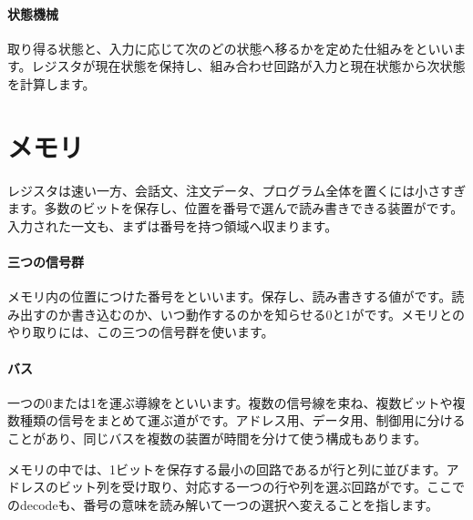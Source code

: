 \par
\endgroup
\medskip
\begingroup
      \centering
      \vspace{3mm}
\paragraph{状態機械}
        取り得る状態と、入力に応じて次のどの状態へ移るかを定めた仕組みをといいます。レジスタが現在状態を保持し、組み合わせ回路が入力と現在状態から次状態を計算します。

\par
\endgroup
\par
\endgroup


\section{メモリ}
\label{sec:01-digital-computer-12}

レジスタは速い一方、会話文、注文データ、プログラム全体を置くには小さすぎます。多数のビットを保存し、位置を番号で選んで読み書きできる装置がです。入力された一文も、まずは番号を持つ領域へ収まります。

\begingroup
\begingroup
\paragraph{三つの信号群}
        メモリ内の位置につけた番号をといいます。保存し、読み書きする値がです。読み出すのか書き込むのか、いつ動作するのかを知らせる0と1がです。メモリとのやり取りには、この三つの信号群を使います。

\paragraph{バス}
        一つの0または1を運ぶ導線をといいます。複数の信号線を束ね、複数ビットや複数種類の信号をまとめて運ぶ道がです。アドレス用、データ用、制御用に分けることがあり、同じバスを複数の装置が時間を分けて使う構成もあります。

        メモリの中では、1ビットを保存する最小の回路であるが行と列に並びます。アドレスのビット列を受け取り、対応する一つの行や列を選ぶ回路がです。ここでのdecodeも、番号の意味を読み解いて一つの選択へ変えることを指します。

\par
\endgroup
\medskip
\begingroup
      \centering
\par
\endgroup
\par
\endgroup


